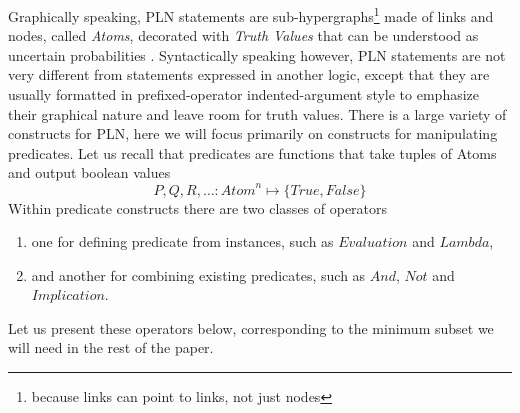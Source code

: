 \documentclass[runningheads]{llncs}
\newcommand{\TTrue}{\textit{True}}
\newcommand{\TFalse}{\textit{False}}
\newcommand{\TAtom}{\textit{Atom}}
\newcommand{\TEval}{\textit{Evaluation}}
\newcommand{\TLamb}{\textit{Lambda}}
\newcommand{\TAnd}{\textit{And}}
\newcommand{\TNot}{\textit{Not}}
\newcommand{\TImpl}{\textit{Implication}}
\begin{document}
Graphically speaking, PLN statements are
sub-hypergraphs\footnote{because links can point to links, not just
nodes} made of links and nodes, called \emph{Atoms}, decorated with
\emph{Truth Values} that can be understood as uncertain probabilities
\cite{TODO}.  Syntactically speaking however, PLN statements are not
very different from statements expressed in another logic, except that
they are usually formatted in prefixed-operator indented-argument
style to emphasize their graphical nature and leave room for truth
values.  There is a large variety of constructs for PLN, here we will
focus primarily on constructs for manipulating predicates.  Let us
recall that predicates are functions that take tuples of Atoms and
output boolean values
$$P, Q, R, \hdots: \TAtom^n \mapsto \{\TTrue, \TFalse\}$$ Within
predicate constructs there are two classes of operators
\begin{enumerate}
\item one for defining predicate from instances, such as $\TEval$ and
  $\TLamb$,
\item and another for combining existing predicates, such as $\TAnd$,
  $\TNot$ and $\TImpl$.
\end{enumerate}
Let us present these operators below, corresponding to the minimum
subset we will need in the rest of the paper.
\end{document}
